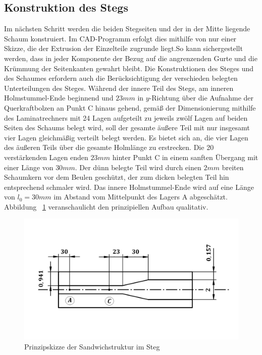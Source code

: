 \subsection{Konstruktion des Stegs}
\noindent Im nächsten Schritt werden die beiden Stegseiten und der in der Mitte liegende Schaum konstruiert. Im CAD-Programm erfolgt dies mithilfe von nur einer Skizze, die der Extrusion der Einzelteile zugrunde liegt.So kann sichergestellt werden, dass in jeder Komponente der Bezug auf die angrenzenden Gurte und die Krümmung der Seitenkanten gewahrt bleibt. Die Konstruktionen des Steges und des Schaumes erfordern auch die Berücksichtigung der verschieden belegten Unterteilungen des Steges. Während der innere Teil des Stegs, am inneren Holmstummel-Ende beginnend und $ 23mm $ in $y$-Richtung über die Aufnahme der Querkraftbolzen an Punkt C hinaus gehend, gemäß der Dimensionierung mithilfe des Laminatrechners mit 24 Lagen aufgeteilt zu jeweils zwölf Lagen auf beiden Seiten des Schaums belegt wird, soll der gesamte äußere Teil mit nur insgesamt vier Lagen gleichmäßig verteilt belegt werden. Es bietet sich an, die vier Lagen des äußeren Teils über die gesamte Holmlänge zu erstrecken. Die 20 verstärkenden Lagen enden $ 23mm $ hinter Punkt C in einem sanften Übergang mit einer Länge von $ 30mm $. Der dünn belegte Teil wird durch einen $ 2mm $ breiten Schaumkern vor dem Beulen geschützt, der zum dicken belegten Teil hin entsprechend schmaler wird. Das innere Holmstummel-Ende wird auf eine Länge von $ l_{0}=30mm $ im Abstand vom Mittelpunkt des Lagers A abgeschätzt. Abbildung ~\ref{fig: Steg} veranschaulicht den prinzipiellen Aufbau qualitativ.

\begin{figure}[h]
	\includegraphics[width=1.0\textwidth]{Bilder/StegPrinzip.jpg}
	\caption{Prinzipskizze der Sandwichstruktur im Steg}
	\label{fig: Steg}
\end{figure}


